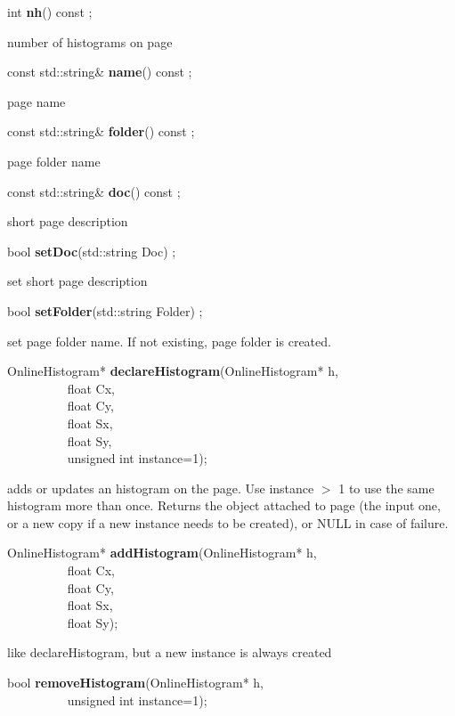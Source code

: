 \item    int {\bf nh}() const ;

 number of histograms on page


\item    const std::string\& {\bf name}() const ;

 page name


\item    const std::string\& {\bf folder}() const ;

 page folder name


\item    const std::string\& {\bf doc}() const ;

 short page description


\item    bool {\bf setDoc}(std::string Doc) ;

 set short page description


\item    bool {\bf setFolder}(std::string Folder) ;

 set page folder name. If not existing, page folder is created.


\item    OnlineHistogram* {\bf declareHistogram}(OnlineHistogram* h,\\\mbox{}~~~~~~~~~
				    float Cx,\\\mbox{}~~~~~~~~~
				    float Cy,\\\mbox{}~~~~~~~~~
				    float Sx,\\\mbox{}~~~~~~~~~
				    float Sy,\\\mbox{}~~~~~~~~~
				    unsigned int instance=1);

 adds or updates an histogram on the page. Use instance $>$ 1 to use the
 same histogram more than once. Returns the object attached to page (the input
 one, or a new copy if a new instance needs to be created), or NULL in case of failure. 


\item    OnlineHistogram* {\bf addHistogram}(OnlineHistogram* h,\\\mbox{}~~~~~~~~~
				float Cx,\\\mbox{}~~~~~~~~~
				float Cy,\\\mbox{}~~~~~~~~~
				float Sx,\\\mbox{}~~~~~~~~~
				float Sy);

 like declareHistogram, but a new instance is always created


\item    bool {\bf removeHistogram}(OnlineHistogram* h,\\\mbox{}~~~~~~~~~
		       unsigned int instance=1);

